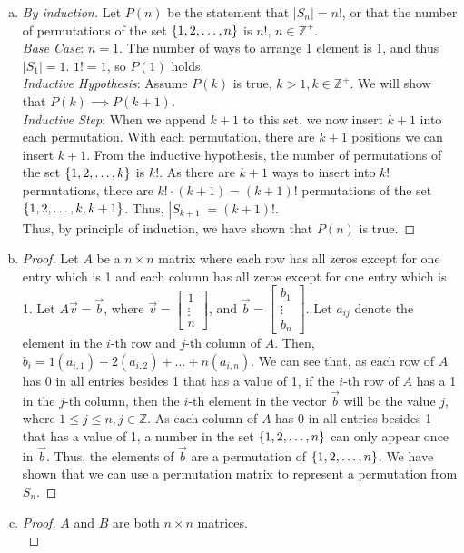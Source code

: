 \documentclass[11pt]{scrartcl}
\theoremstyle{dotlessP}
\theoremstyle{dotlessN}
\DeclarePairedDelimiter\set{\{}{\}}
\newcommand{\ints}{\mathbb{Z}}
\begin{document}
\begin{enumerate}[(a)]
	\item 
		\begin{proof}
			[By induction]
			Let $P(n)$ be the statement that $|S_n| = n!$,  or that the number of permutations of the set $\set*{1, 2, \dots, n}$ is $n!$, $n \in \ints^+$.
			\\
			
			\textit{Base Case}: $n = 1$. The number of ways to arrange 1 element is 1, and thus $|S_1| = 1$. $1! = 1$, so $P(1)$ holds.
			\\

			\textit{Inductive Hypothesis}: Assume $P(k)$ is true, $k > 1, k \in \ints^+$. We will show that $P(k) \implies P(k+1)$.
			\\

			\textit{Inductive Step}:  When we append $k+1$ to this set, we now insert $k+1$ into each permutation. With each permutation, there are $k+1$ positions we can insert $k+1$. From the inductive hypothesis, the number of permutations of the set  $\set*{1, 2, \dots, k}$ is $k!$. As there are $k+1$ ways to insert into $k!$ permutations, there are $k! \cdot (k+1) = (k+1)!$ permutations of the set $\set*{1,2,\dots,k,k+1}$. Thus, $|S_{k+1}| = (k+1)!$.
			\\

			Thus, by principle of induction, we have shown that $P(n)$ is true.
		\end{proof}
	\item 
		\begin{proof}
			Let $A$ be a $n \times n$ matrix where each row has all zeros except for one entry which is 1 and each column has all zeros except for one entry which is 1. Let $A\vec{v} = \vec{b}$, where $\vec{v} = 
\begin{bmatrix}
	1 \\
	\vdots \\
	n
\end{bmatrix}
$, and $\vec{b} = 
\begin{bmatrix}
	b_1 \\
	\vdots \\
	b_n
\end{bmatrix}
$. Let  $a_{ij}$ denote the element in the $i$-th row and $j$-th column of $A$. Then, $b_i = 1(a_{i,1}) + 2(a_{i,2}) + \dots + n(a_{i,n})$. We can see that, as each row of $A$ has 0 in all entries besides 1 that has a value of 1, if the $i$-th row of $A$ has a 1 in the $j$-th column, then the $i$-th element in the vector $\vec{b}$ will be the value $j$, where $1 \leq j \leq n, j \in \ints$. As each column of $A$ has 0 in all entries besides 1 that has a value of 1, a number in the set $\set*{1,2,\dots, n}$ can only appear once in  $\vec{b}$. Thus, the elements of $\vec{b}$ are a permutation of $\set*{1,2,\dots, n}$. We have shown that we can use a permutation matrix to represent a permutation from $S_n$.
		\end{proof}
	\item 
		\begin{proof}
			$A$ and $B$ are both $n \times n$ matrices.
			\\


\end{proof}
\end{enumerate}
\end{document}
